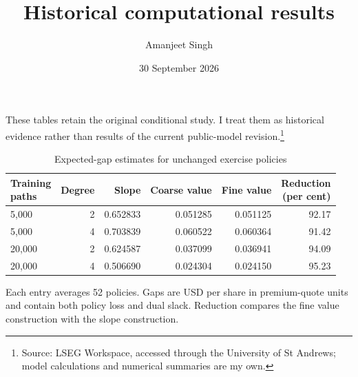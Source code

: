 \documentclass[11pt]{article}
\title{Historical computational results}
\author{Amanjeet Singh}
\date{30 September 2026}
\begin{document}
\maketitle
These tables retain the original conditional study. I treat them as historical evidence rather than results of the current public-model revision.\footnote{Source: LSEG Workspace, accessed through the University of St Andrews; model calculations and numerical summaries are my own.}

\begin{table}[htbp]
\centering\small
\caption{Expected-gap estimates for unchanged exercise policies}\label{tab:measurement}
\setlength{\tabcolsep}{4pt}
\begin{tabular}{lrrrrr}
\toprule
\shortstack{Training\\paths} & Degree & Slope & Coarse value & Fine value & \shortstack{Reduction\\(per cent)} \\
\midrule
5,000 & 2 & 0.652833 & 0.051285 & 0.051125 & 92.17 \\
5,000 & 4 & 0.703839 & 0.060522 & 0.060364 & 91.42 \\
20,000 & 2 & 0.624587 & 0.037099 & 0.036941 & 94.09 \\
20,000 & 4 & 0.506690 & 0.024304 & 0.024150 & 95.23 \\
\bottomrule
\end{tabular}
\par\smallskip\begin{minipage}{\textwidth}\footnotesize Each entry averages 52 policies. Gaps are USD per share in premium-quote units and contain both policy loss and dual slack. Reduction compares the fine value construction with the slope construction.\end{minipage}
\end{table}
\end{document}
